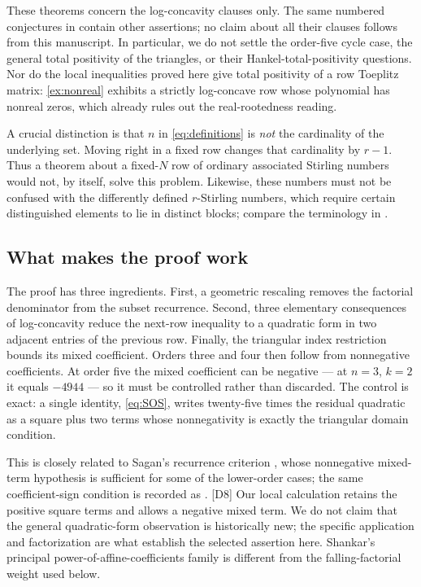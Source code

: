 \documentclass[11pt,a4paper]{article}
\numberwithin{equation}{section}
\theoremstyle{definition}
\theoremstyle{remark}
\newcommand{\dup}[1]{{\small\textsf{\color{MutedInk}[#1]}}}
\begin{document}
These theorems concern the log-concavity clauses only. The same numbered
conjectures in \cite{DebSokal} contain other assertions; no claim about
all their clauses follows from this manuscript. In particular, we do not
settle the order-five cycle case, the general total positivity of the
triangles, or their Hankel-total-positivity questions. Nor do the local
inequalities proved here give total positivity of a row Toeplitz matrix:
\cref{ex:nonreal} exhibits a strictly log-concave row whose polynomial
has nonreal zeros, which already rules out the real-rootedness reading.

A crucial distinction is that $n$ in \eqref{eq:definitions} is \emph{not}
the cardinality of the underlying set. Moving right in a fixed row changes
that cardinality by $r-1$. Thus a theorem about a fixed-$N$ row of ordinary
associated Stirling numbers would not, by itself, solve this problem.
Likewise, these numbers must not be confused with the differently defined
$r$-Stirling numbers, which require certain distinguished elements to lie
in distinct blocks; compare the terminology in \cite[Section~1]{Shankar}.

\subsection{What makes the proof work}

The proof has three ingredients. First, a geometric rescaling removes the
factorial denominator from the subset recurrence. Second, three elementary
consequences of log-concavity reduce the next-row inequality to a quadratic
form in two adjacent entries of the previous row. Finally, the triangular
index restriction bounds its mixed coefficient. Orders three and four then
follow from nonnegative coefficients. At order five the mixed coefficient
can be negative --- at $n=3$, $k=2$ it equals $-4944$ --- so it must be
controlled rather than discarded. The control is exact: a single identity,
\eqref{eq:SOS}, writes twenty-five times the residual quadratic as a square
plus two terms whose nonnegativity is exactly the triangular domain
condition.

This is closely related to Sagan's recurrence criterion
\cite[Theorem~1]{Sagan}, whose nonnegative mixed-term hypothesis is sufficient
for some of the lower-order cases; the same coefficient-sign condition is
recorded as \cite[Theorem~1.2]{Shankar}. \dup{D8} Our local calculation
retains the positive square terms and allows a negative mixed term. We do
not claim that the general quadratic-form observation is historically new;
the specific application and factorization are what establish the selected
assertion here. Shankar's principal power-of-affine-coefficients family is
different from the falling-factorial weight used below.
\end{document}

